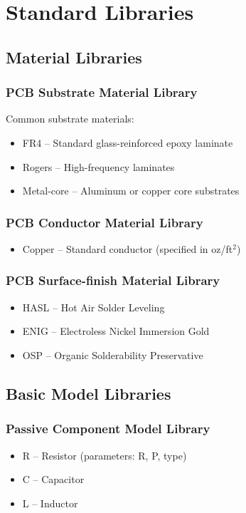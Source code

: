 \appendix
\chapter{Standard Libraries}
\section{Material Libraries}
\subsection{PCB Substrate Material Library}
Common substrate materials:
\begin{itemize}
\item FR4 -- Standard glass-reinforced epoxy laminate
\item Rogers -- High-frequency laminates
\item Metal-core -- Aluminum or copper core substrates
\end{itemize}

\subsection{PCB Conductor Material Library}
\begin{itemize}
\item Copper -- Standard conductor (specified in oz/ft$^2$)
\end{itemize}

\subsection{PCB Surface-finish Material Library}
\begin{itemize}
\item HASL -- Hot Air Solder Leveling
\item ENIG -- Electroless Nickel Immersion Gold
\item OSP -- Organic Solderability Preservative
\end{itemize}

\section{Basic Model Libraries}
\subsection{Passive Component Model Library}
\begin{itemize}
\item R -- Resistor (parameters: R, P, type)
\item C -- Capacitor
\item L -- Inductor
\end{itemize}

